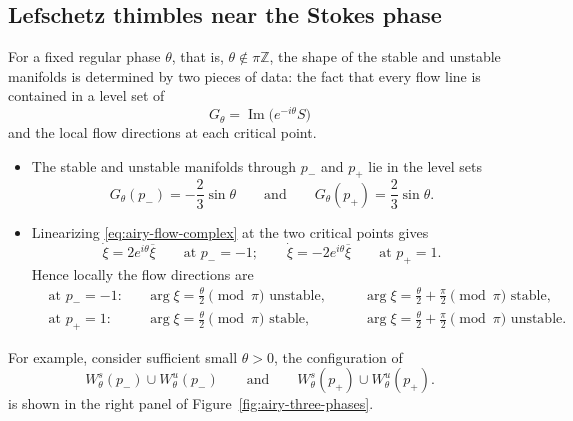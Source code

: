 \documentclass[11pt]{amsart}
\theoremstyle{plain}
\newcommand{\Z}{\mathbb Z}
\newcommand{\im}{\operatorname{Im}}
\begin{document}
\subsection{Lefschetz thimbles near the Stokes phase}
For a fixed regular phase \(\theta\), that is, $\theta \notin \pi\Z$, the shape of the stable and unstable manifolds is determined by two pieces of data: the fact that every flow line is contained in a level set of 
$$
G_\theta=\im\bigl(e^{-i\theta}S)
$$
and the local flow directions at each critical point. 
\begin{itemize}
    \item The stable and unstable manifolds through \(p_-\) and \(p_+\) lie in the level sets
\begin{equation*}\label{eq:airy-Gtheta-levels}
G_\theta(p_-)=-\frac23\sin\theta
\qquad\text{and}\qquad
G_\theta(p_+)=\frac23\sin\theta.
\end{equation*}
    \item Linearizing \eqref{eq:airy-flow-complex} at the two critical points gives
\begin{equation*}
\dot\xi=
2e^{i\theta}\overline{\xi}
\qquad\text{at }p_-=-1;
\qquad
\dot\xi=
-2e^{i\theta}\overline{\xi}
\qquad\text{at }p_+=1.
\end{equation*}
Hence locally the flow directions are 
\begin{equation*}\label{eq:airy-linearization-summary}
\begin{aligned}
&\text{at }p_-=-1: &&\arg\xi=\frac\theta2 \pmod\pi \text{ unstable},
&&\quad\arg\xi=\frac\theta2+\frac\pi2 \pmod\pi \text{ stable},
\\
&\text{at }p_+=1:&&\arg\xi=\frac\theta2 \pmod\pi \text{ stable},
&&\quad\arg\xi=\frac\theta2+\frac\pi2 \pmod\pi \text{ unstable}.
\end{aligned}
\end{equation*}
\end{itemize}


For example, consider sufficient small $\theta>0$, the configuration of 
\[
W^s_\theta(p_-)\cup W^u_\theta(p_-)
\qquad\text{and}\qquad
W^s_\theta(p_+)\cup W^u_\theta(p_+).
\]
is shown in the right panel of Figure~\ref{fig:airy-three-phases}.


\smallskip
\end{document}
